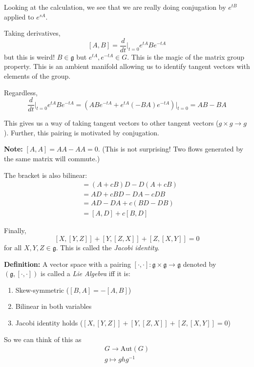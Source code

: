 \documentclass[12pt]{article}
\newcommand{\Aut}{\text{Aut}}
\begin{document}
    Looking at the calculation, we see that we are really doing conjugation by $e^{tB}$ applied to $e^{sA}$. 

    Taking derivatives, 
    \[[A, B] = \frac{d}{dt}\bigg\vert_{t=0} e^{tA} Be^{-tA}\] 
    but this is weird! $B \in \mathfrak{g}$ but $e^{tA}, e^{-tA} \in G$. This is the magic of the matrix group property. This is an ambient manifold allowing us to identify tangent vectors with elements of the group. 

    Regardless, 
    \[\frac{d}{dt}\bigg\vert_{t=0} e^{tA} Be^{-tA} = (ABe^{-tA} + e^{tA}(-BA)e^{-tA})\bigg\vert_{t=0} = AB - BA\]
    
    This gives us a way of taking tangent vectors to other tangent vectors ($g \times g \to g$). Further, this pairing is motivated by conjugation.

    \textbf{Note:} $[A, A] = AA - AA = 0$. (This is not surprising! Two flows generated by the same matrix will commute.)

    The bracket is also bilinear: 
    \begin{align*}
        [A + cB, D] &= (A + cB)D - D(A + cB)\\ 
        &= AD + cBD - DA - cDB\\ 
        & = AD - DA + c(BD - DB)\\ 
        &= [A, D] + c[B, D]
    \end{align*}

    Finally, 
    \[[X, [Y, Z]] + [Y, [Z, X]] + [Z, [X, Y]] =0\]
    for all $X, Y, Z \in \mathfrak{g}$. This is called the \emph{Jacobi identity}. 

    \textbf{Definition:} A vector space with a pairing $[\cdot, \cdot]:\mathfrak{g}\times\mathfrak{g}\to \mathfrak{g}$ denoted by $(\mathfrak{g}, [\cdot, \cdot])$ is called a \emph{Lie Algebra} iff it is:
    \begin{enumerate}
        \item Skew-symmetric ($[B, A] = -[A, B]$)
        \item Bilinear in both variables 
        \item Jacobi identity holds ($[X, [Y, Z]] + [Y, [Z, X]] + [Z, [X, Y]] = 0$)
    \end{enumerate}

    So we can think of this as 
    \[\begin{array}{c}
        G \to \Aut(G)\\ 
        g \mapsto ghg^{-1}
    \end{array}\]
\end{document}

